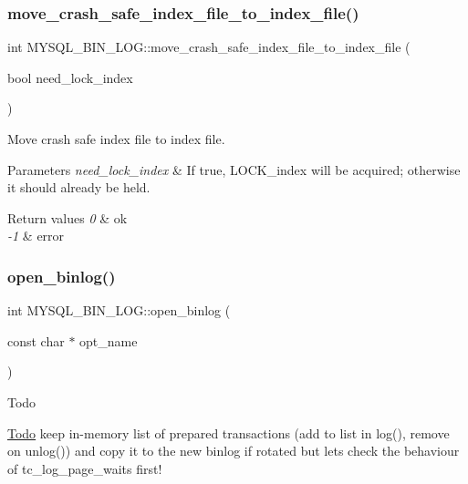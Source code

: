\subsubsection{\texorpdfstring{move\+\_\+crash\+\_\+safe\+\_\+index\+\_\+file\+\_\+to\+\_\+index\+\_\+file()}{move\_crash\_safe\_index\_file\_to\_index\_file()}}
{\footnotesize\ttfamily int M\+Y\+S\+Q\+L\+\_\+\+B\+I\+N\+\_\+\+L\+O\+G\+::move\+\_\+crash\+\_\+safe\+\_\+index\+\_\+file\+\_\+to\+\_\+index\+\_\+file (\begin{DoxyParamCaption}\item[{bool}]{need\+\_\+lock\+\_\+index }\end{DoxyParamCaption})}

Move crash safe index file to index file.


\begin{DoxyParams}{Parameters}
{\em need\+\_\+lock\+\_\+index} & If true, L\+O\+C\+K\+\_\+index will be acquired; otherwise it should already be held.\\
\hline
\end{DoxyParams}

\begin{DoxyRetVals}{Return values}
{\em 0} & ok \\
\hline
{\em -\/1} & error \\
\hline
\end{DoxyRetVals}
\mbox{\label{group__Binary__Log_ga44de4e3109fc4d50d4968191ab0f3544}} 
\subsubsection{\texorpdfstring{open\+\_\+binlog()}{open\_binlog()}\hspace{0.1cm}{\footnotesize\ttfamily [1/2]}}
{\footnotesize\ttfamily int M\+Y\+S\+Q\+L\+\_\+\+B\+I\+N\+\_\+\+L\+O\+G\+::open\+\_\+binlog (\begin{DoxyParamCaption}\item[{const char $\ast$}]{opt\+\_\+name }\end{DoxyParamCaption})}

\begin{DoxyRefDesc}{Todo}
\item[\mbox{\hyperlink{todo__todo000008}{Todo}}]keep in-\/memory list of prepared transactions (add to list in log(), remove on unlog()) and copy it to the new binlog if rotated but let\textquotesingle{}s check the behaviour of tc\+\_\+log\+\_\+page\+\_\+waits first! \end{DoxyRefDesc}
\mbox{\label{group__Binary__Log_ga8614d8fb3c4c2c255145d6cfd992e8d8}} 
